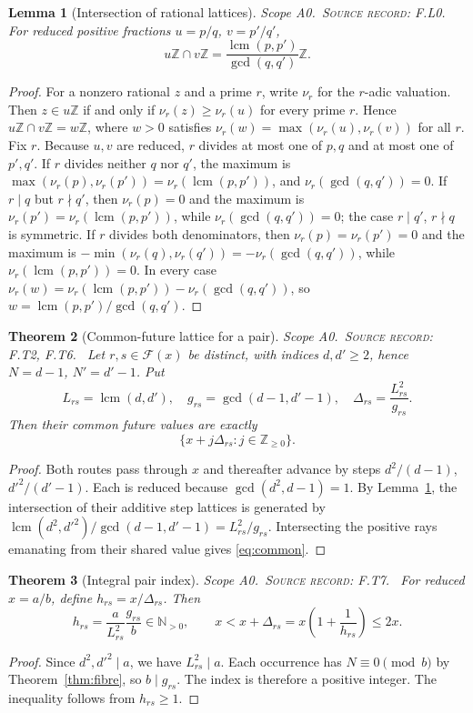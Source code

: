 \documentclass[11pt,oneside,openany]{book}
\newtheorem{theorem}{Theorem}[chapter]
\newtheorem{lemma}[theorem]{Lemma}
\theoremstyle{definition}
\theoremstyle{remark}
\newcommand{\N}{\mathbb{N}}
\newcommand{\Z}{\mathbb{Z}}
\newcommand{\Fx}{\mathcal{F}}
\newcommand{\lcmop}{\operatorname{lcm}}
\newcommand{\gcdop}{\operatorname{gcd}}
\newcommand{\scope}[1]{\textsf{\small Scope #1.}\ }
\newcommand{\record}[1]{\textup{\textsc{Source record: #1.}}\ }
\newcommand{\Del}{\Delta}
\begin{document}
\begin{lemma}[Intersection of rational lattices]\label{lem:lcm}
\scope{A0}\record{F.L0} For reduced positive fractions \(u=p/q\), \(v=p'/q'\),
\[
 u\Z\cap v\Z=\frac{\lcmop(p,p')}{\gcdop(q,q')}\Z.
\]
\end{lemma}
\begin{proof}
For a nonzero rational \(z\) and a prime \(r\), write \(\nu_r\) for the \(r\)-adic valuation. Then \(z\in u\Z\) if and only if \(\nu_r(z)\ge\nu_r(u)\) for every prime \(r\). Hence \(u\Z\cap v\Z=w\Z\), where \(w>0\) satisfies \(\nu_r(w)=\max(\nu_r(u),\nu_r(v))\) for all \(r\). Fix \(r\). Because \(u,v\) are reduced, \(r\) divides at most one of \(p,q\) and at most one of \(p',q'\). If \(r\) divides neither \(q\) nor \(q'\), the maximum is \(\max(\nu_r(p),\nu_r(p'))=\nu_r(\lcmop(p,p'))\), and \(\nu_r(\gcdop(q,q'))=0\). If \(r\mid q\) but \(r\nmid q'\), then \(\nu_r(p)=0\) and the maximum is \(\nu_r(p')=\nu_r(\lcmop(p,p'))\), while \(\nu_r(\gcdop(q,q'))=0\); the case \(r\mid q'\), \(r\nmid q\) is symmetric. If \(r\) divides both denominators, then \(\nu_r(p)=\nu_r(p')=0\) and the maximum is \(-\min(\nu_r(q),\nu_r(q'))=-\nu_r(\gcdop(q,q'))\), while \(\nu_r(\lcmop(p,p'))=0\). In every case \(\nu_r(w)=\nu_r(\lcmop(p,p'))-\nu_r(\gcdop(q,q'))\), so \(w=\lcmop(p,p')/\gcdop(q,q')\).
\end{proof}

\begin{theorem}[Common-future lattice for a pair]\label{thm:pair}
\scope{A0}\record{F.T2, F.T6} Let \(r,s\in\Fx(x)\) be distinct, with indices \(d,d'\ge2\), hence \(N=d-1\), \(N'=d'-1\). Put
\[
 L_{rs}=\lcmop(d,d'),\quad g_{rs}=\gcdop(d-1,d'-1),\quad
 \Del_{rs}=\frac{L_{rs}^2}{g_{rs}}.
\]
Then their common future values are exactly
\begin{equation}\label{eq:common}
 \{x+j\Del_{rs}:j\in\Z_{\ge0}\}.
\end{equation}
\end{theorem}
\begin{proof}
Both routes pass through \(x\) and thereafter advance by steps \(d^2/(d-1)\), \(d'^2/(d'-1)\). Each is reduced because \(\gcdop(d^2,d-1)=1\). By Lemma~\ref{lem:lcm}, the intersection of their additive step lattices is generated by
\(\lcmop(d^2,d'^2)/\gcdop(d-1,d'-1)=L_{rs}^2/g_{rs}\). Intersecting the positive rays emanating from their shared value gives \eqref{eq:common}.
\end{proof}

\begin{theorem}[Integral pair index]\label{thm:pairindex}
\scope{A0}\record{F.T7} For reduced \(x=a/b\), define \(h_{rs}=x/\Del_{rs}\). Then
\[
 h_{rs}=\frac{a}{L_{rs}^2}\frac{g_{rs}}b\in\N_{>0},\qquad
 x< x+\Del_{rs}=x\left(1+\frac1{h_{rs}}\right)\le2x.
\]
\end{theorem}
\begin{proof}
Since \(d^2,d'^2\mid a\), we have \(L_{rs}^2\mid a\). Each occurrence has \(N\equiv0\pmod b\) by Theorem~\ref{thm:fibre}, so \(b\mid g_{rs}\). The index is therefore a positive integer. The inequality follows from \(h_{rs}\ge1\).
\end{proof}
\end{document}
